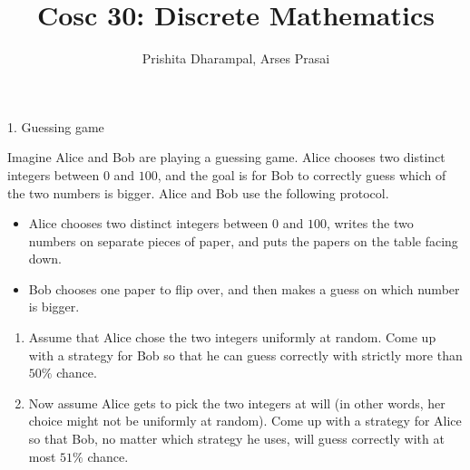 \documentclass[12pt]{article}
\begin{document}
\title{Cosc 30: Discrete Mathematics}

\author{Prishita Dharampal, Arses Prasai}
\date{}
\maketitle


\begin{problem}{1. Guessing game}
        
    Imagine Alice and Bob are playing a guessing game. Alice chooses two distinct integers between \(0\) and \(100\), and the goal is for Bob to correctly guess which of the two numbers is bigger. Alice and Bob use the following protocol.
    \begin{itemize}
        \item Alice chooses two distinct integers between \(0\) and \(100\), writes the two numbers on separate pieces of paper, and puts the papers on the table facing down.
        \item Bob chooses one paper to flip over, and then makes a guess on which number is bigger.

    \end{itemize}

    \begin{enumerate}
        \item Assume that Alice chose the two integers uniformly at random. Come up with a strategy for Bob so that he can guess correctly with strictly more than \(50\%\) chance.
        \item[$\star$ 2.] Now assume Alice gets to pick the two integers at will (in other words, her choice might not be uniformly at random). Come up with a strategy for Alice so that Bob, no matter which strategy he uses, will guess correctly with at most \(51\%\) chance.
    \end{enumerate}
\end{problem}
\end{document}
